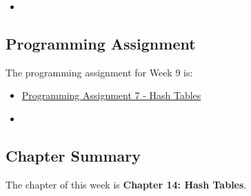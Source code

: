 \begin{itemize}
    \item {}
\end{itemize}

\subsection{Programming Assignment}

The programming assignment for Week 9 is:

\begin{itemize}
    \item \href{https://github.com/QuantumCompiler/CU/tree/main/CSPB%202270%20-%20Data%20Structures/Assignments/Assignment%207%20-%20Hash%20Table}{Programming Assignment 7 - Hash Tables}
    \item {}
\end{itemize}

\newpage

\subsection{Chapter Summary}

The chapter of this week is \textbf{Chapter 14: Hash Tables}.

